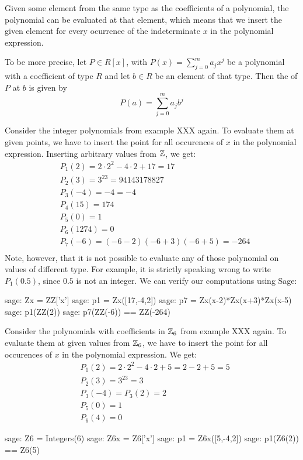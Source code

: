 Given some element from the same type as the coefficients of a polynomial, the polynomial can be evaluated at that element, which means that we insert the given element for every ocurrence of the indeterminate $x$ in the polynomial expression. 

To be more precise, let $P\in R[x]$, with $P(x)=\sum_{j=0}^m a_j x^j$ be a polynomial with a coefficient of type $R$ and let $b\in R$ be an element of that type. Then the  of $P$ at $b$ is given by
\begin{equation}
P(a) = \sum_{j=0}^m a_j b^j
\end{equation}
\begin{example}Consider the integer polynomials from example XXX again. To evaluate them at given points, we have to insert the point for all occurences of $x$ in the polynomial expression. Inserting arbitrary values from $\mathbb{Z}$, we get:
\begin{align*}
 &P_1(2)    = 2\cdot 2^2 -4\cdot 2 +17 = 17 \\
 &P_2(3)    = 3^{23}=94143178827 \\
 &P_3(-4)   = -4 = -4 \\
 &P_4(15)   = 174 \\
 &P_5(0)    = 1 \\
 &P_6(1274) =0 \\
 &P_7(-6)   = (-6-2)(-6+3)(-6+5) = -264 \\
\end{align*}
Note, however, that it is not possible to evaluate any of those polynomial on values of different type. For example, it is strictly speaking wrong to write $P_1(0.5)$, since $0.5$ is not an integer. We can verify our computations using Sage:
\begin{sagecommandline}
sage: Zx = ZZ['x']
sage: p1 = Zx([17,-4,2])
sage: p7 = Zx(x-2)*Zx(x+3)*Zx(x-5)
sage: p1(ZZ(2))
sage: p7(ZZ(-6)) == ZZ(-264)
\end{sagecommandline}

\end{example}
\begin{example} Consider the polynomials with coefficients in $\mathbb{Z}_6$ from example XXX again. To evaluate them at given values from $\mathbb{Z}_6$, we have to insert the point for all occurences of $x$ in the polynomial expression. We get:
\begin{align*}
 & P_1(2)= 2\cdot 2^2 -4\cdot 2 +5 = 2 - 2 + 5 = 5\\
 &P_2(3)= 3^{23}=3\\
 &P_3(-4)= P_3(2) = 2\\
 &P_5(0)= 1\\
 &P_6(4)=0
\end{align*}
\begin{sagecommandline}
sage: Z6 = Integers(6)
sage: Z6x = Z6['x']
sage: p1 = Z6x([5,-4,2])
sage: p1(Z6(2)) == Z6(5)
\end{sagecommandline}

\end{example}
